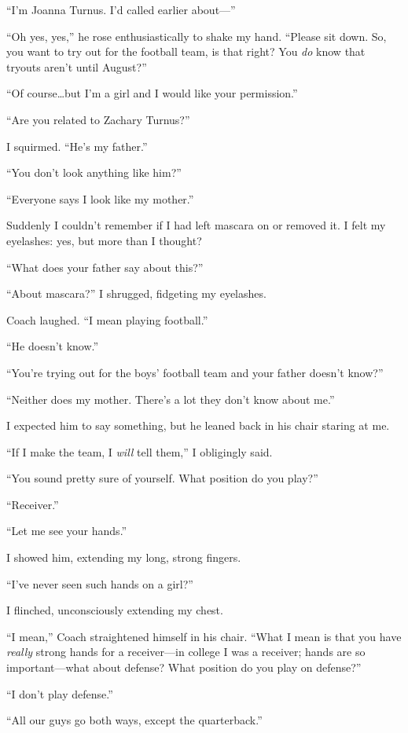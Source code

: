 ``I'm Joanna Turnus. I'd called earlier about---''

``Oh yes, yes,'' he rose enthusiastically to shake my hand. ``Please sit
down. So, you want to try out for the football team, is that right? You
\emph{do} know that tryouts aren't until August?''

``Of course\ldots but I'm a girl and I would like your permission.''

``Are you related to Zachary Turnus?''

I squirmed. ``He's my father.''

``You don't look anything like him?''

``Everyone says I look like my mother.''

Suddenly I couldn't remember if I had left mascara on or removed it. I
felt my eyelashes: yes, but more than I thought?

``What does your father say about this?''

``About mascara?'' I shrugged, fidgeting my eyelashes.

Coach laughed. ``I mean playing football.''

``He doesn't know.''

``You're trying out for the boys' football team and your father doesn't
know?''

``Neither does my mother. There's a lot they don't know about me.''

I expected him to say something, but he leaned back in his chair staring
at me.

``If I make the team, I \emph{will} tell them,'' I obligingly said.

``You sound pretty sure of yourself. What position do you play?''

``Receiver.''

``Let me see your hands.''

I showed him, extending my long, strong fingers.

``I've never seen such hands on a girl?''

I flinched, unconsciously extending my chest.

``I mean,'' Coach straightened himself in his chair. ``What I mean is
that you have \emph{really} strong hands for a receiver---in college I
was a receiver; hands are so important---what about defense? What
position do you play on defense?''

``I don't play defense.''

``All our guys go both ways, except the quarterback.''

